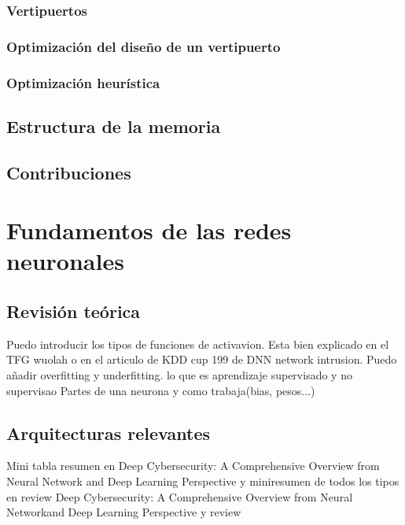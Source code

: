 \documentclass[12pt,a4paper]{book}
\begin{document}
\subsection{Vertipuertos} \label{Subsec: 1_2_2}

\subsection{Optimización del diseño de un vertipuerto} \label{Subsec: 1_2_3}

\subsection{Optimización heurística} \label{Subsubsec: 1_2_4}



\section{Estructura de la memoria} \label{Subsubsec: 1_3}
  


\section{Contribuciones} \label{Subsec: 1_4}

\chapter{Fundamentos de las redes neuronales} \label{Capitulo_2}


 

\section{Revisión teórica} \label{Subsec: 3_1}
Puedo introducir los tipos de funciones de activavion. Esta bien explicado en el TFG wuolah o en el articulo de KDD cup 199 de DNN network intrusion.
Puedo añadir overfitting y underfitting.
lo que es aprendizaje supervisado y no supervisao
Partes de una neurona y como trabaja(bias, pesos...)


\section{Arquitecturas relevantes} \label{Subsec: 3_2}
Mini tabla resumen en Deep Cybersecurity: A Comprehensive Overview from Neural Network and Deep Learning Perspective y miniresumen de todos los tipos en review Deep Cybersecurity: A Comprehensive Overview from Neural Networkand Deep Learning Perspective y review
\end{document}

